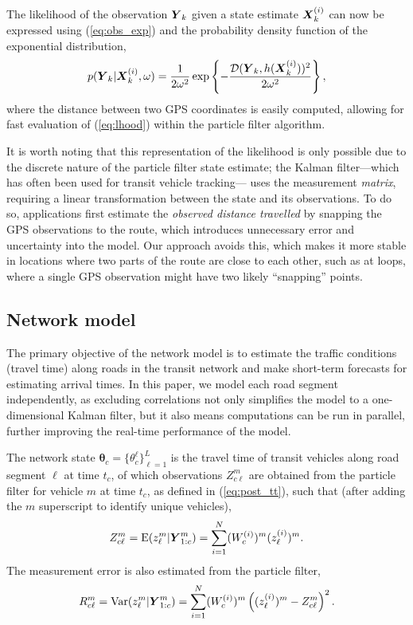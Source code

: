The likelihood of the observation $\mbox{$\boldsymbol{Y}$}_k$ given a state estimate $\mbox{$\boldsymbol{X}$}_k^{(i)}$
can now be expressed using (\ref{eq:obs_exp}) 
and the probability density function of the exponential distribution,
\begin{equation}
\label{eq:lhood}
p(\mbox{$\boldsymbol{Y}$}_k | \mbox{$\boldsymbol{X}$}_k^{(i)}, \omega) =
\frac{1}{2\omega^2}\exp\left\{
    -\frac{\mathcal{D}(\mbox{$\boldsymbol{Y}$}_k, h(\mbox{$\boldsymbol{X}$}_k^{(i)}))^2}{2\omega^2}
\right\},
\end{equation}
where the distance between two GPS coordinates is easily computed,
allowing for fast evaluation of (\ref{eq:lhood}) within the particle filter algorithm.


It is worth noting that this representation of the likelihood is only
possible due to the discrete nature of the particle filter state estimate;
the Kalman filter---which has often been used for transit vehicle tracking---%
uses the measurement \emph{matrix}, requiring a linear
transformation between the state and its observations.
To do so, applications first estimate the \emph{observed distance travelled}
by snapping the GPS observations to the route,
which introduces unnecessary error and uncertainty into the model.
Our approach avoids this, which makes it more stable in locations where two 
parts of the route are close to each other,
such as at loops, where a single GPS observation might have two likely ``snapping'' points.


\subsection{Network model}
\label{sec:kf}

The primary objective of the network model is to estimate the \rt traffic conditions
(travel time) along roads in the transit network
and make short-term forecasts for estimating arrival times.
In this paper, we model each road segment independently,
as excluding correlations not only simplifies the model to a one-dimensional Kalman filter,
but it also means computations can be run in parallel,
further improving the real-time performance of the model.


The network state $\boldsymbol\theta_c = \{\theta_c^\ell\}_{\ell = 1}^L$ is the travel time 
of transit vehicles along road segment $\ell$ at time $t_c$,
of which observations $Z_{c\ell}^{m}$
are obtained from the particle filter for vehicle $m$ at time $t_c$,
as defined in (\ref{eq:post_tt}), such that 
(after adding the $m$ superscript to identify unique vehicles), 
\begin{equation}
\label{eq:tt_obs_mean}
Z_{c\ell}^{m} = \mathrm{E}(z_{\ell}^{m} | \mbox{$\boldsymbol{Y}$}^m_{1:c}) = 
\sum_{i=1}^N (W_c^{(i)})^m (z_\ell^{(i)})^{m}.
\end{equation}
The measurement error is also estimated from the particle filter,
\begin{equation}
\label{eq:tt_obs_err}
R_{c\ell}^m = \mathrm{Var}(z_{\ell}^{m} | \mbox{$\boldsymbol{Y}$}^m_{1:c}) = 
\sum_{i=1}^N (W_c^{(i)})^m \left((z_\ell^{(i)})^{m} - Z_{c\ell}^{m}\right)^2.
\end{equation}

